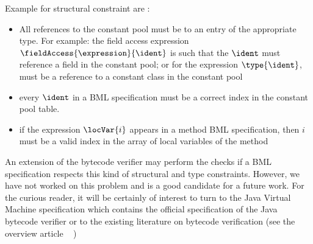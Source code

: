Example for structural constraint are :
\begin{itemize}
    \item All references to the constant pool must be to an entry of the appropriate type. For example:
          the field access expression  $\fieldAccess{\expression}{\ident}$ is such that the
	  $\ident$ must reference a field in the constant pool; or for the expression $\type{\ident}$, \ident
	  must be a reference to a constant class in the constant pool
    
    \item every $\ident$ in a BML specification must be a correct index in the constant pool table. 
    
    \item if the  expression $\locVar{i}$ appears in a method BML specification, then
          $i$ must be a valid index in the array of local variables of the method
\end{itemize}

An extension of the bytecode verifier may perform the checks
 if a BML specification  respects this kind of structural and type constraints.
However, we have not worked on this problem and is a good candidate for a future work.
For the curious reader, it will be certainly of interest to turn to the Java Virtual Machine 
specification \cite{VMSpec} which contains the official
 specification of the Java bytecode verifier    
or to the existing literature on bytecode verification (see the overview article ~\cite{Ljbc} )
 








